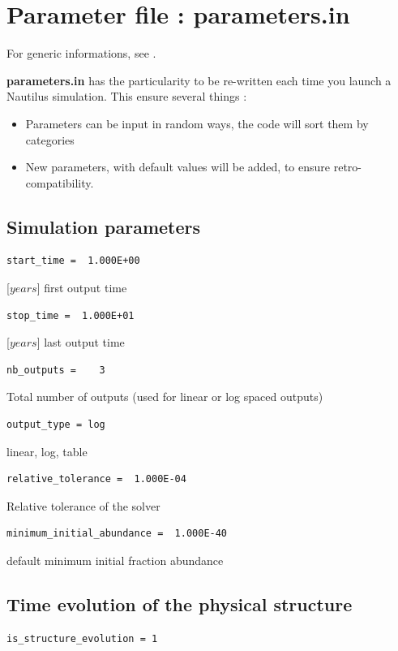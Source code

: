 \documentclass[english,a4paper,twoside]{article}
\begin{document}
\section{Parameter file : parameters.in}\label{sec:parameters_in}
For generic informations, see .

\textbf{parameters.in} has the particularity to be re-written each time you launch a Nautilus simulation. This ensure several things :
\begin{itemize}
\item Parameters can be input in random ways, the code will sort them by categories
\item New parameters, with default values will be added, to ensure retro-compatibility.
\end{itemize}

\subsection{Simulation parameters}
\begin{verbatim}
start_time =  1.000E+00
\end{verbatim}
[$\unit{years}$] first output time

\begin{verbatim}
stop_time =  1.000E+01
\end{verbatim}
[$\unit{years}$] last output time

\begin{verbatim}
nb_outputs =    3
\end{verbatim}
Total number of outputs (used for linear or log spaced outputs)

\begin{verbatim}
output_type = log
\end{verbatim}
linear, log, table

\begin{verbatim}
relative_tolerance =  1.000E-04
\end{verbatim}
Relative tolerance of the solver

\begin{verbatim}
minimum_initial_abundance =  1.000E-40
\end{verbatim}
default minimum initial fraction abundance

\subsection{Time evolution of the physical structure}\label{parameter!is_structure_evolution}
\begin{verbatim}
is_structure_evolution = 1
\end{verbatim}
\end{document}

